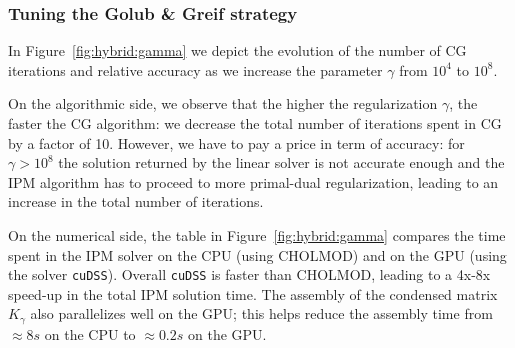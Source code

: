 \begin{table}[!ht]
  \centering
  \caption{Comparing the performance of cuDSS with CHOLMOD.
    The matrix $K_\gamma$ is symmetric positive definite, with
    a size $n = 674,562$. The matrix is extremely sparse, with only $7,342,680$ non-zero entries ($0.002$\%).
    \label{tab:linsol:time}
    (A100 GPU)
  }
\end{table}

\subsubsection{Tuning the Golub \& Greif strategy}
In Figure~\ref{fig:hybrid:gamma} we depict the evolution of the number
of CG iterations and relative accuracy as we increase the parameter $\gamma$
from $10^4$ to $10^8$.

On the algorithmic side, we observe that the higher the regularization $\gamma$,
the faster the CG algorithm: we decrease the total number of iterations
spent in CG by a factor of 10. However, we have to pay a price in term
of accuracy: for $\gamma > 10^8$ the solution returned by the linear solver
is not accurate enough and the IPM algorithm has to proceed to more
primal-dual regularization, leading to an increase in the total number of iterations.

On the numerical side, the table in Figure~\ref{fig:hybrid:gamma} compares
the time spent in the IPM solver on the CPU (using CHOLMOD) and on the GPU
(using the solver {\tt cuDSS}). Overall {\tt cuDSS} is
faster than CHOLMOD, leading to a 4x-8x speed-up in the total IPM solution time.
The assembly of the condensed matrix $K_\gamma$ also parallelizes well
on the GPU; this helps reduce the assembly time from $\approx 8s$ on the CPU to $\approx 0.2s$ on the GPU.

